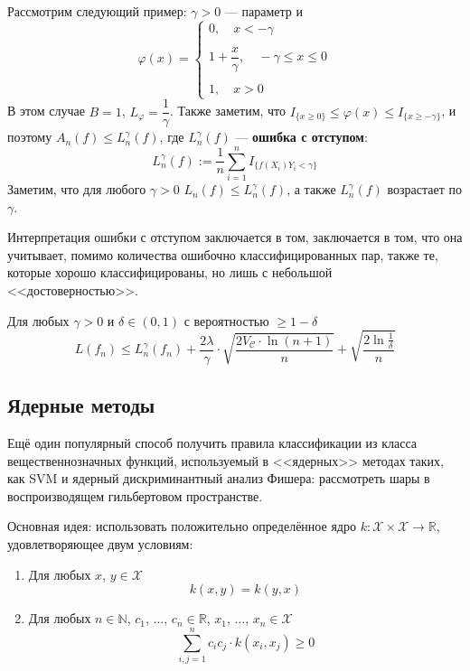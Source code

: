 \documentclass[12pt]{article}
\newtheorem{corollary}{\hskip\parindent Следствие}%
\begin{document}
Рассмотрим следующий пример: $\gamma>0$ --- параметр и
\begin{equation*}
	\varphi(x)=\begin{cases}
		0, \quad x<-\gamma\\ \\
		1+\dfrac{x}{\gamma}, \quad -\gamma\leqslant x\leqslant0\\ \\
		1, \quad x>0
	\end{cases}
\end{equation*}
В этом случае $B=1$, $L_\varphi=\dfrac{1}{\gamma}$. Также заметим, что $I_{\{x\geqslant0\}}\leqslant\varphi(x)\leqslant I_{\{x\geqslant-\gamma\}}$, и поэтому $A_n(f)\leqslant L_n^\gamma(f)$, где $L_n^\gamma(f)$ --- \textbf{ошибка с отступом}:
\begin{equation*}
	L_n^\gamma(f):=\frac{1}{n}\sum\limits_{i=1}^{n}I_{\{f(X_i)Y_i<\gamma\}}
\end{equation*}
Заметим, что для любого $\gamma>0$ $L_n(f)\leqslant L_n^\gamma(f)$, а также $L_n^\gamma(f)$ возрастает по $\gamma$.

Интерпретация ошибки с отступом заключается в том, заключается в том, что она учитывает, помимо количества ошибочно классифицированных пар, также те, которые хорошо классифицированы, но лишь с небольшой <<достоверностью>>.

\begin{corollary}
	Для любых $\gamma>0$ и $\delta\in(0,1)$ с вероятностью $\geqslant1-\delta$
	\begin{equation*}
		L(f_n)\leqslant L_n^\gamma(f_n)+\frac{2\lambda}{\gamma}\cdot\sqrt{\frac{2V_\mathcal{C}\cdot\ln(n+1)}{n}}+\sqrt{\frac{2\ln\frac{1}{\delta}}{n}}
	\end{equation*}
\end{corollary}
\subsection{Ядерные методы}
Ещё один популярный способ получить правила классификации из класса вещественнозначных функций, используемый в <<ядерных>> методах таких, как SVM и ядерный дискриминантный анализ Фишера: рассмотреть шары в воспроизводящем гильбертовом пространстве.

Основная идея: использовать положительно определённое ядро $k:\mathcal{X}\times\mathcal{X}\to\mathbb{R}$, удовлетворяющее двум условиям:
\begin{enumerate}
	\item Для любых $x$, $y\in\mathcal{X}$
	\begin{equation*}
		k(x,y)=k(y,x)
	\end{equation*}
	\item Для любых $n\in\mathbb{N}$, $c_1$, $\dots$, $c_n\in\mathbb{R}$, $x_1$, $\dots$, $x_n\in\mathcal{X}$
	\begin{equation*}
		\sum\limits_{i,j=1}^{n}c_ic_j\cdot k(x_i,x_j)\geqslant0
	\end{equation*} 
\end{enumerate}
\end{document}
